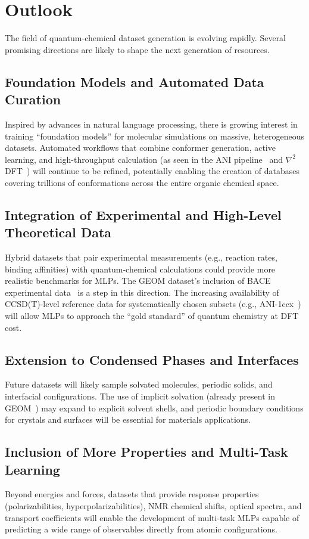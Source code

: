 \documentclass[12pt]{article}
\begin{document}
\section{Outlook}

The field of quantum-chemical dataset generation is evolving rapidly. Several promising directions are likely to shape the next generation of resources.

\subsection*{Foundation Models and Automated Data Curation}
Inspired by advances in natural language processing, there is growing interest in training ``foundation models'' for molecular simulations on massive, heterogeneous datasets. Automated workflows that combine conformer generation, active learning, and high-throughput calculation (as seen in the ANI pipeline~\cite{ds26-3} and $\nabla^2$DFT~\cite{ds31-23}) will continue to be refined, potentially enabling the creation of databases covering trillions of conformations across the entire organic chemical space.

\subsection*{Integration of Experimental and High-Level Theoretical Data}
Hybrid datasets that pair experimental measurements (e.g., reaction rates, binding affinities) with quantum-chemical calculations could provide more realistic benchmarks for MLPs. The GEOM dataset's inclusion of BACE experimental data~\cite{ds34-166} is a step in this direction. The increasing availability of CCSD(T)-level reference data for systematically chosen subsets (e.g., ANI-1ccx~\cite{ds26-3}) will allow MLPs to approach the ``gold standard'' of quantum chemistry at DFT cost.

\subsection*{Extension to Condensed Phases and Interfaces}
Future datasets will likely sample solvated molecules, periodic solids, and interfacial configurations. The use of implicit solvation (already present in GEOM~\cite{ds34-16}) may expand to explicit solvent shells, and periodic boundary conditions for crystals and surfaces will be essential for materials applications.

\subsection*{Inclusion of More Properties and Multi-Task Learning}
Beyond energies and forces, datasets that provide response properties (polarizabilities, hyperpolarizabilities), NMR chemical shifts, optical spectra, and transport coefficients will enable the development of multi-task MLPs capable of predicting a wide range of observables directly from atomic configurations.
\end{document}

